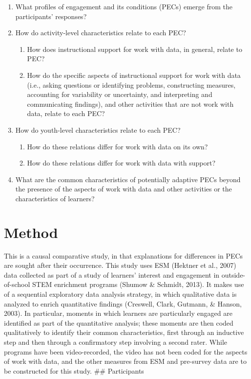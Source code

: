 \documentclass[]{book}
\providecommand{\tightlist}{%
  \setlength{\itemsep}{0pt}\setlength{\parskip}{0pt}}
\theoremstyle{definition}
\theoremstyle{definition}
\theoremstyle{definition}
\theoremstyle{remark}
\begin{document}
\begin{enumerate}
\def\labelenumi{\arabic{enumi}.}
\tightlist
\item
  What profiles of engagement and its conditions (PECs) emerge from the
  participants' responses?
\item
  How do activity-level characteristics relate to each PEC?

  \begin{enumerate}
  \def\labelenumii{\arabic{enumii}.}
  \tightlist
  \item
    How does instructional support for work with data, in general,
    relate to PEC?
  \item
    How do the specific aspects of instructional support for work with
    data (i.e., asking questions or identifying problems, constructing
    measures, accounting for variability or uncertainty, and
    interpreting and communicating findings), and other activities that
    are not work with data, relate to each PEC?
  \end{enumerate}
\item
  How do youth-level characteristics relate to each PEC?

  \begin{enumerate}
  \def\labelenumii{\arabic{enumii}.}
  \tightlist
  \item
    How do these relations differ for work with data on its own?
  \item
    How do these relations differ for work with data with support?
  \end{enumerate}
\item
  What are the common characteristics of potentially adaptive PECs
  beyond the presence of the aspects of work with data and other
  activities or the characteristics of learners?
\end{enumerate}

\chapter{Method}\label{method}

This is a causal comparative study, in that explanations for differences
in PECs are sought after their occurrence. This study uses ESM (Hektner
et al., 2007) data collected as part of a study of learners' interest
and engagement in outside-of-school STEM enrichment programs (Shumow \&
Schmidt, 2013). It makes use of a sequential exploratory data analysis
strategy, in which qualitative data is analyzed to enrich quantitative
findings (Creswell, Clark, Gutmann, \& Hanson, 2003). In particular,
moments in which learners are particularly engaged are identified as
part of the quantitative analysis; these moments are then coded
qualitatively to identify their common characteristics, first through an
inductive step and then through a confirmatory step involving a second
rater. While programs have been video-recorded, the video has not been
coded for the aspects of work with data, and the other measures from ESM
and pre-survey data are to be constructed for this study. \#\#
Participants
\end{document}
